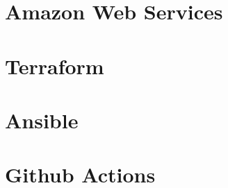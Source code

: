 \documentclass[a4paper]{article}
\begin{document}
    \subsection{}
    \subsection{}
    
    \newpage
    \section{Amazon Web Services}
    \subsection{}
    \subsection{}
    
    \newpage
    \section{Terraform}
    \subsection{}
    \subsection{}
    
    \newpage
    \section{Ansible}
    \subsection{}
    \subsection{}

    \newpage
    \section{Github Actions}
    \subsection{}
    \subsection{}
\end{document}
